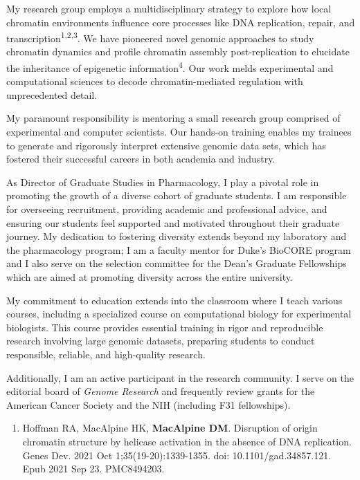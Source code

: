 \begin{statement}
My research group employs a multidisciplinary strategy to explore how local chromatin environments influence core processes like DNA replication, repair, and transcription\textsuperscript{1,2,3}. We have pioneered novel genomic approaches to study chromatin dynamics and profile chromatin assembly post-replication to elucidate the inheritance of epigenetic information\textsuperscript{4}. Our work melds experimental and computational sciences to decode chromatin-mediated regulation with unprecedented detail.

My paramount responsibility is mentoring a small research group comprised of experimental and computer scientists. Our hands-on training enables my trainees to generate and rigorously interpret extensive genomic data sets, which has fostered their successful careers in both academia and industry.

As Director of Graduate Studies in Pharmacology, I play a pivotal role in promoting the growth of a diverse cohort of graduate students. I am responsible for overseeing recruitment, providing academic and professional advice, and ensuring our students feel supported and motivated throughout their graduate journey. My dedication to fostering diversity extends beyond my laboratory and the pharmacology program; I am a faculty mentor for Duke's  BioCORE program and I also serve on the selection committee for the Dean's Graduate Fellowships which are aimed at promoting diversity across the entire university.  

My commitment to education extends into the classroom where I teach various courses, including a specialized course on computational biology for experimental biologists. This course provides essential training in rigor and reproducible research involving large genomic datasets, preparing students to conduct responsible, reliable, and high-quality research.

Additionally, I am an active participant in the research community. I serve on the editorial board of \textit{Genome Research} and frequently review grants for the American Cancer Society and the NIH (including F31 fellowships).  

\begin{enumerate}

\item Hoffman RA, MacAlpine HK, \textbf{MacAlpine DM}. Disruption of origin chromatin structure by helicase activation in the absence of DNA replication. Genes Dev. 2021 Oct 1;35(19-20):1339-1355. doi: 10.1101/gad.34857.121. Epub 2021 Sep 23. PMC8494203.


\end{enumerate}
\end{statement}
